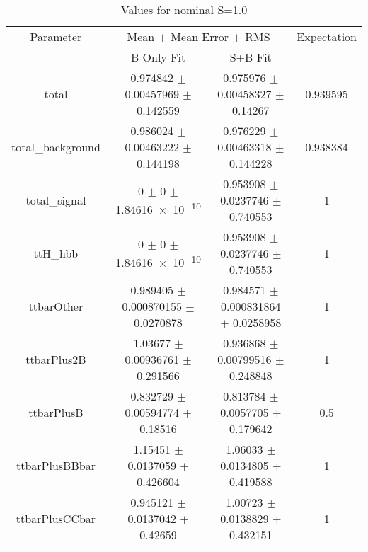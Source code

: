 \begin{table}
\centering
\caption{Values for nominal S=1.0}
\begin{tabular}{cccc}
\toprule
Parameter & \multicolumn{2}{c}{Mean $\pm$ Mean Error $\pm$ RMS} & Expectation\\
 & B-Only Fit & S+B Fit & \\
\midrule
total & \num{0.974842} $\pm$ \num{0.00457969} $\pm$ \num{0.142559} & \num{0.975976} $\pm$ \num{0.00458327} $\pm$ \num{0.14267} & \num{0.939595}\\
total\_background & \num{0.986024} $\pm$ \num{0.00463222} $\pm$ \num{0.144198} & \num{0.976229} $\pm$ \num{0.00463318} $\pm$ \num{0.144228} & \num{0.938384}\\
total\_signal & \num{0} $\pm$ \num{0} $\pm$ \num{1.84616e-10} & \num{0.953908} $\pm$ \num{0.0237746} $\pm$ \num{0.740553} & \num{1}\\
ttH\_hbb & \num{0} $\pm$ \num{0} $\pm$ \num{1.84616e-10} & \num{0.953908} $\pm$ \num{0.0237746} $\pm$ \num{0.740553} & \num{1}\\
ttbarOther & \num{0.989405} $\pm$ \num{0.000870155} $\pm$ \num{0.0270878} & \num{0.984571} $\pm$ \num{0.000831864} $\pm$ \num{0.0258958} & \num{1}\\
ttbarPlus2B & \num{1.03677} $\pm$ \num{0.00936761} $\pm$ \num{0.291566} & \num{0.936868} $\pm$ \num{0.00799516} $\pm$ \num{0.248848} & \num{1}\\
ttbarPlusB & \num{0.832729} $\pm$ \num{0.00594774} $\pm$ \num{0.18516} & \num{0.813784} $\pm$ \num{0.0057705} $\pm$ \num{0.179642} & \num{0.5}\\
ttbarPlusBBbar & \num{1.15451} $\pm$ \num{0.0137059} $\pm$ \num{0.426604} & \num{1.06033} $\pm$ \num{0.0134805} $\pm$ \num{0.419588} & \num{1}\\
ttbarPlusCCbar & \num{0.945121} $\pm$ \num{0.0137042} $\pm$ \num{0.42659} & \num{1.00723} $\pm$ \num{0.0138829} $\pm$ \num{0.432151} & \num{1}\\
\bottomrule
\end{tabular}
\end{table}
